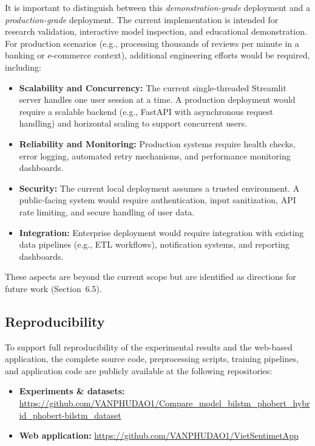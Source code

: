 \documentclass[12pt]{report} %
\begin{document}
It is important to distinguish between this \emph{demonstration-grade} deployment and a \emph{production-grade} deployment. The current implementation is intended for research validation, interactive model inspection, and educational demonstration. For production scenarios (e.g., processing thousands of reviews per minute in a banking or e-commerce context), additional engineering efforts would be required, including:
\begin{itemize}
    \item \textbf{Scalability and Concurrency:} The current single-threaded Streamlit server handles one user session at a time. A production deployment would require a scalable backend (e.g., FastAPI with asynchronous request handling) and horizontal scaling to support concurrent users.
    \item \textbf{Reliability and Monitoring:} Production systems require health checks, error logging, automated retry mechanisms, and performance monitoring dashboards.
    \item \textbf{Security:} The current local deployment assumes a trusted environment. A public-facing system would require authentication, input sanitization, API rate limiting, and secure handling of user data.
    \item \textbf{Integration:} Enterprise deployment would require integration with existing data pipelines (e.g., ETL workflows), notification systems, and reporting dashboards.
\end{itemize}
These aspects are beyond the current scope but are identified as directions for future work (Section~6.5).

\subsection{Reproducibility}
\label{subsec:reproducibility}

To support full reproducibility of the experimental results and the web-based application, the complete source code, preprocessing scripts, training pipelines, and application code are publicly available at the following repositories:

\begin{itemize}
    \item \textbf{Experiments \& datasets:} \url{https://github.com/VANPHUDAO1/Compare_model_bilstm_phobert_hybrid_phobert-bilstm_dataset}
    \item \textbf{Web application:} \url{https://github.com/VANPHUDAO1/VietSentimetApp}
\end{itemize}
\end{document}
